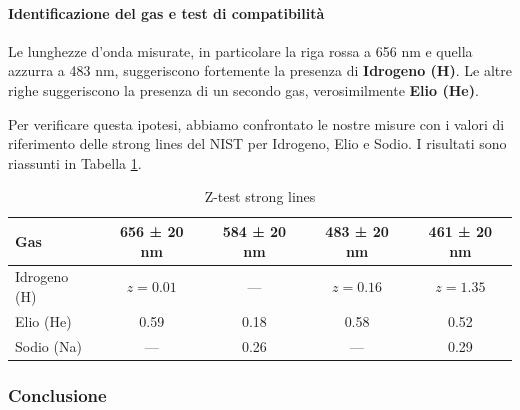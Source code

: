 \documentclass[a4paper]{article}
\begin{document}
\paragraph{Identificazione del gas e test di compatibilità}
Le lunghezze d'onda misurate, in particolare la riga rossa a 656 nm e quella azzurra a 483 nm, suggeriscono fortemente la presenza di \textbf{Idrogeno (H)}. Le altre righe suggeriscono la presenza di un secondo gas, verosimilmente \textbf{Elio (He)}.

Per verificare questa ipotesi, abbiamo confrontato le nostre misure con i valori di riferimento delle strong lines del NIST per Idrogeno, Elio e Sodio. I risultati sono riassunti in Tabella \ref{tab:z_test}.
\begin{table}[H]
\centering
\caption{Z-test strong lines}
\label{tab:z_test}
\begin{tabular}{l c c c c}
\toprule
\textbf{Gas} & \textbf{656 ± 20 nm} & \textbf{584 ± 20 nm} & \textbf{483 ± 20 nm} & \textbf{461 ± 20 nm} \\
\midrule
Idrogeno (H) & $z = 0.01$ & --- & $z=0.16$ & $z=1.35$ \\
Elio (He)    & 0.59 & 0.18 & 0.58 & 0.52 \\
Sodio (Na)   & --- & 0.26 & --- & 0.29 \\
\bottomrule
\end{tabular}
\end{table}

\subsubsection{Conclusione}
\end{document}
